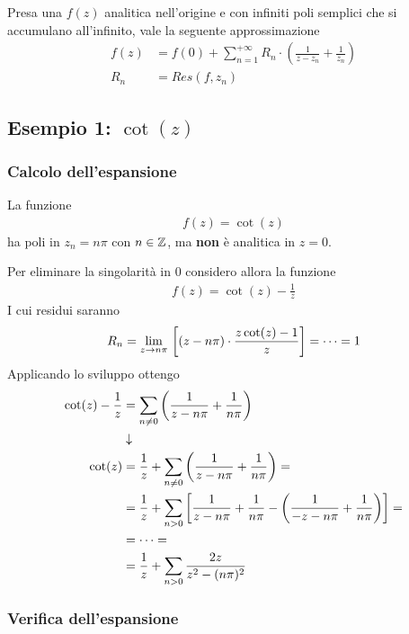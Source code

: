 Presa una $f(z)$ analitica nell'origine e con infiniti poli semplici che si accumulano all'infinito, vale la seguente approssimazione
\begin{align}
	f(z) &= f(0) + \sum_{n=1}^{+\infty} R_n \cdot \left( \frac{1}{z-z_n} + \frac{1}{z_n} \right)\\
	R_n &= Res(f, z_n)
\end{align}


\subsection{Esempio 1: $\cot (z)$}

\subsubsection{Calcolo dell'espansione}

La funzione  
\begin{align}
	f(z) = \cot(z)
\end{align}
ha poli in $z_n = n\pi$ con $n\in \mathbb{Z}$, ma \textbf{non} è analitica in $z=0$.

Per eliminare la singolarità in 0 considero allora la funzione
\begin{align}
	f(z) = \cot(z) - \frac{1}{z}
\end{align}
I cui residui saranno
\begin{align}
	R_n = \underset{z \rightarrow n\pi}{\lim} \, \left[ (z-n\pi) \cdot \frac{z\cot(z) -1}{z} \right] = \dots = 1  
\end{align}
Applicando lo sviluppo ottengo
\begin{align}
	\cot(z) - \frac{1}{z} &= \sum_{n\neq 0} \left( \frac{1}{z-n\pi} + \frac{1}{n\pi}\right) \\ &\downarrow \nonumber \\
	\cot(z) &= \frac{1}{z} + \sum_{n\neq 0} \left( \frac{1}{z-n\pi} + \frac{1}{n\pi}\right) = \nonumber\\
	&= \frac{1}{z} + \sum_{n>0} \left[ \frac{1}{z-n\pi} + \frac{1}{n\pi} - \left( \frac{1}{-z-n\pi} + \frac{1}{n\pi} \right) \right] = \nonumber\\
	&= \dots  = \nonumber\\
	&= \frac{1}{z} + \sum_{n>0} \frac{2z}{z^2 - (n\pi)^2}
\end{align}

\newpage

\subsubsection{Verifica dell'espansione}

